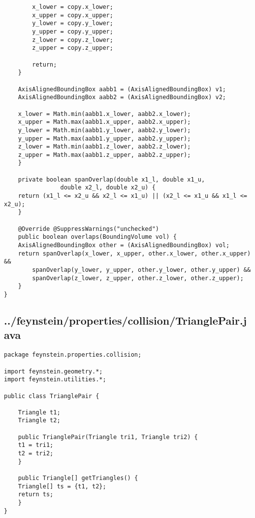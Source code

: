 \begin{lstlisting}
	    x_lower = copy.x_lower;
	    x_upper = copy.x_upper;
	    y_lower = copy.y_lower;
	    y_upper = copy.y_upper;
	    z_lower = copy.z_lower;
	    z_upper = copy.z_upper;

	    return;
	}

	AxisAlignedBoundingBox aabb1 = (AxisAlignedBoundingBox) v1;
	AxisAlignedBoundingBox aabb2 = (AxisAlignedBoundingBox) v2;

	x_lower = Math.min(aabb1.x_lower, aabb2.x_lower);
	x_upper = Math.max(aabb1.x_upper, aabb2.x_upper);
	y_lower = Math.min(aabb1.y_lower, aabb2.y_lower);
	y_upper = Math.max(aabb1.y_upper, aabb2.y_upper);
	z_lower = Math.min(aabb1.z_lower, aabb2.z_lower);
	z_upper = Math.max(aabb1.z_upper, aabb2.z_upper);
    }

    private boolean spanOverlap(double x1_l, double x1_u, 
				double x2_l, double x2_u) {
	return (x1_l <= x2_u && x2_l <= x1_u) || (x2_l <= x1_u && x1_l <= x2_u);
    }

    @Override @SuppressWarnings("unchecked")	
    public boolean overlaps(BoundingVolume vol) {
	AxisAlignedBoundingBox other = (AxisAlignedBoundingBox) vol;
	return spanOverlap(x_lower, x_upper, other.x_lower, other.x_upper) &&
	    spanOverlap(y_lower, y_upper, other.y_lower, other.y_upper) &&
	    spanOverlap(z_lower, z_upper, other.z_lower, other.z_upper);
    }	    
}\end{lstlisting}

\subsection*{../feynstein/properties/collision/TrianglePair.java}
\begin{lstlisting}
package feynstein.properties.collision;

import feynstein.geometry.*;
import feynstein.utilities.*;

public class TrianglePair {

    Triangle t1;
    Triangle t2;

    public TrianglePair(Triangle tri1, Triangle tri2) {
	t1 = tri1;
	t2 = tri2;
    }

    public Triangle[] getTriangles() {
	Triangle[] ts = {t1, t2};
	return ts;
    }
}\end{lstlisting}

